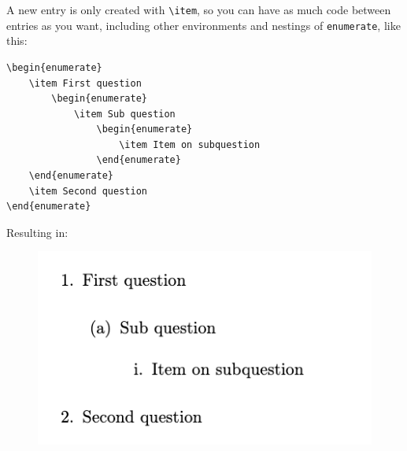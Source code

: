A new entry is only created with \verb|\item|, so you can have as much code between entries as you want, including other environments and nestings of \verb|enumerate|, like this:
\begin{lstlisting}
\begin{enumerate}
    \item First question
        \begin{enumerate}
            \item Sub question
                \begin{enumerate}
                    \item Item on subquestion
                \end{enumerate}
    \end{enumerate}
    \item Second question
\end{enumerate}
\end{lstlisting}
Resulting in:
\begin{figure}[h]
    \centering
        \includegraphics[]{figures/list-nested.png}
    \label{fig:list-nested}
\end{figure}
